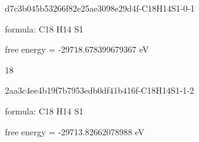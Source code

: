 \documentclass{article}
\begin{document}
\vspace{1cm}


d7c3b045b53266f82e25ae3098e29d4f-C18H14S1-0-1



formula: C18 H14 S1



free energy = -29718.678399679367 eV

18

\vspace{1cm}


2aa3c4ee4b19f7b7953edb0df41b416f-C18H14S1-1-2



formula: C18 H14 S1



free energy = -29713.82662078988 eV
\end{document}
